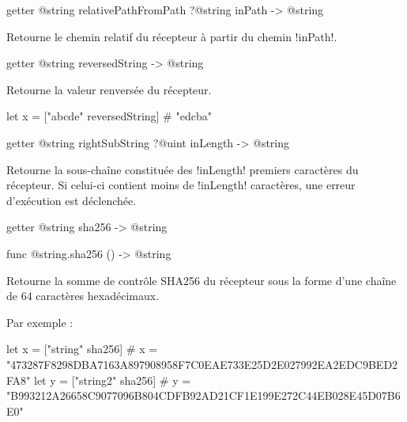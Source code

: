 
\begin{galgas3box}
getter @string relativePathFromPath ?@string inPath -> @string
\end{galgas3box}

Retourne le chemin relatif du récepteur à partir du chemin \ggst!inPath!.










\begin{galgas3box}
getter @string reversedString -> @string
\end{galgas3box}

Retourne la valeur renversée du récepteur.

\begin{galgas3}
let x = ["abcde" reversedString] # "edcba"
\end{galgas3}









\begin{galgas3box}
getter @string rightSubString ?@uint inLength -> @string
\end{galgas3box}

Retourne la sous-chaîne constituée des \ggst!inLength! premiers caractères du récepteur. Si celui-ci contient moins de \ggst!inLength! caractères, une erreur d'exécution est déclenchée.




\begin{galgas3box}
getter @string sha256 -> @string
\end{galgas3box}

\begin{galgas4box}
func @string.sha256 () -> @string
\end{galgas4box}

Retourne la somme de contrôle SHA256 du récepteur sous la forme d'une chaîne de 64 caractères hexadécimaux.

Par exemple :
\begin{galgas3}
  let x = ["string"  sha256]
    # x = "473287F8298DBA7163A897908958F7C0EAE733E25D2E027992EA2EDC9BED2FA8"
  let y = ["string2" sha256]
    # y = "B993212A26658C9077096B804CDFB92AD21CF1E199E272C44EB028E45D07B6E0"
\end{galgas3}

